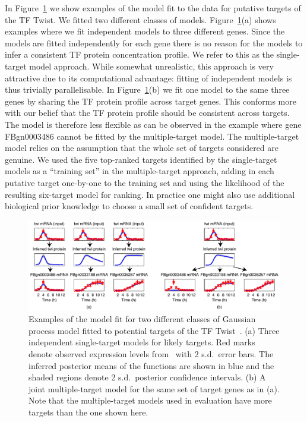\documentclass{article}
\begin{document}
In Figure~\ref{fig:gpdisim_models} we show examples of the model fit to
the data for putative targets of the TF Twist. We fitted two different
classes of models. Figure~\ref{fig:gpdisim_models}(a) shows examples
where we fit independent models to three different genes. Since the
models are fitted independently for each gene there is no reason for
the models to infer a consistent TF protein concentration profile. We
refer to this as the single-target model approach. While somewhat
unrealistic, this approach is very attractive due to its computational
advantage: fitting of independent models is thus trivially
parallelisable. In
Figure~\ref{fig:gpdisim_models}(b) we fit one model to the same three
genes by sharing the TF protein profile across target genes. This
conforms more with our belief that the TF protein profile should be
consistent across targets. The model is therefore less flexible as can
be observed in the example where gene FBgn0003486 cannot be fitted by
the multiple-target model. The multiple-target model relies on the assumption
that the whole set of targets considered are genuine. We used the five
top-ranked targets identified by the single-target models as a ``training set'' in the
multiple-target approach, adding in each putative target one-by-one to
the training set and using the likelihood of the resulting six-target model for
ranking. In practice one might also use additional biological prior knowledge
to choose a small set of confident targets. 

\begin{figure}[tb]
  \centering
  \includegraphics[width=12cm]{../disim_pnas/fig1}
  \caption{Examples of the model fit for two different classes of 
    Gaussian process model fitted to potential targets of the TF Twist~\citep[from][]{Honkela:modelbased10}. (a) Three independent single-target models
    for likely targets. Red marks denote observed expression
    levels from~\cite{Tomancak2002} with 2 s.d.\ error bars.
    The inferred posterior means of the functions are shown in blue
    and the shaded regions denote 2 s.d.\ posterior confidence
    intervals. (b) A joint multiple-target model for
    the same set of target genes as in (a). Note that
    the multiple-target models used in evaluation have more targets
    than the one shown here.\label{fig:gpdisim_models}
}
\end{figure}
\end{document}
